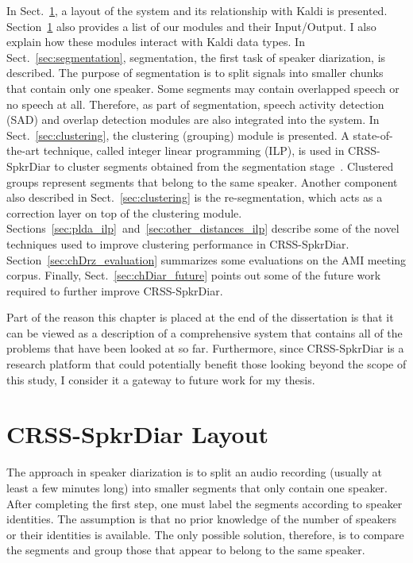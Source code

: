 In Sect.~\ref{sec:crssdiar_layout}, a layout of the system and its relationship with Kaldi is presented. 
Section~\ref{sec:crssdiar_layout} also provides a list of our modules and their Input/Output. 
I also explain how these modules interact with Kaldi data types. 
In Sect.~\ref{sec:segmentation}, segmentation, the first task of speaker diarization, is described. 
The purpose of segmentation is to split signals into smaller chunks that contain only one speaker. 
Some segments may contain overlapped speech or no speech at all. 
Therefore, as part of segmentation, speech activity detection (SAD) and overlap detection modules are also integrated into the system. 
In Sect.~\ref{sec:clustering}, the clustering (grouping) module is presented. 
A state-of-the-art technique, called integer linear programming (ILP), is used in CRSS-SpkrDiar to cluster segments obtained from the segmentation stage~\cite{bredin2013ILP}. 
Clustered groups represent segments that belong to the same speaker. Another component also described in Sect.~\ref{sec:clustering} is the re-segmentation, which acts as a correction layer on top of the clustering module. 
Sections~\ref{sec:plda_ilp}~and~\ref{sec:other_distances_ilp} describe some of the novel techniques used to improve clustering performance in CRSS-SpkrDiar. 
Section~\ref{sec:chDrz_evaluation} summarizes some evaluations on the AMI meeting corpus. 
Finally, Sect.~\ref{sec:chDiar_future} points out some of the future work required to further improve CRSS-SpkrDiar. 

Part of the reason this chapter is placed at the end of the dissertation is that it can be viewed as a description of a comprehensive system that contains all of the problems that have been looked at so far. 
Furthermore, since CRSS-SpkrDiar is a research platform that could potentially benefit those looking beyond the scope of this study, I consider it a gateway to future work for my thesis. 



 
\section{CRSS-SpkrDiar Layout}
\label{sec:crssdiar_layout}

The approach in speaker diarization is to split an audio recording (usually at least a few minutes long) into smaller segments that only contain one speaker.
After completing the first step, one must label the segments according to speaker identities. 
The assumption is that no prior knowledge of the number of speakers or their identities is available. 
The only possible solution, therefore, is to compare the segments and group those that appear to belong to the same speaker. 

